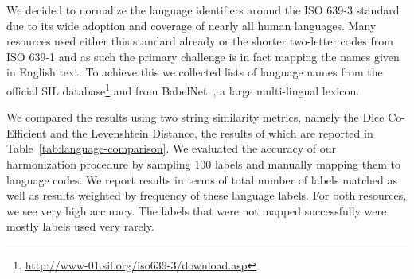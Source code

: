 \documentclass[smallextended]{svjour3}       %
\begin{document}
\begin{table}
    \caption{\label{tab:language-comparison}Accuracy of language mappings}
\end{table}

We decided to normalize the language identifiers around the ISO 639-3 standard
due to its wide adoption and coverage of nearly all human languages. Many
resources used either this standard already or the shorter two-letter codes from
ISO 639-1 and as such the primary challenge is in fact mapping the names given
in English text. To achieve this we collected lists of language names from the
official SIL
database\footnote{\url{http://www-01.sil.org/iso639-3/download.asp}} and from
BabelNet~\cite{navigli2010babelnet}, a large multi-lingual lexicon.

We compared the results using two string similarity metrics, namely the Dice
Co-Efficient and the Levenshtein Distance, the results of which are reported in
Table~\ref{tab:language-comparison}. 
We evaluated the accuracy of our harmonization procedure by sampling 100 labels
and manually mapping them to language codes.  We report results in terms of
total number of labels matched as well as results weighted by frequency of these
language labels.  For both resources, we see very high accuracy. The labels that
were not mapped successfully were mostly labels used very rarely. 
\end{document}
